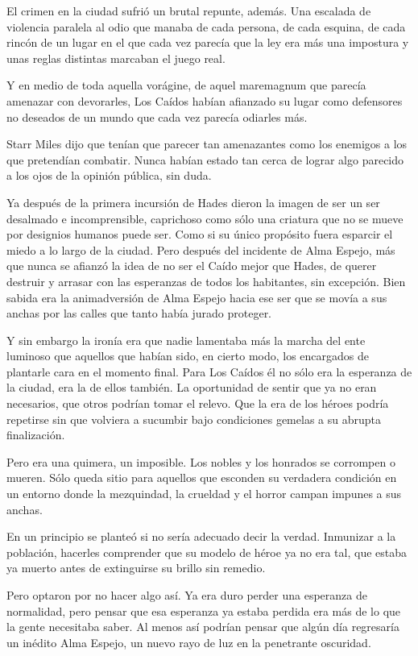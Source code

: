El crimen en la ciudad sufrió un brutal repunte, además. Una escalada de violencia paralela al odio que manaba de cada persona, de cada esquina, de cada rincón de un lugar en el que cada vez parecía que la ley era más una impostura y unas reglas distintas marcaban el juego real.

Y en medio de toda aquella vorágine, de aquel maremagnum que parecía amenazar con devorarles, Los Caídos habían afianzado su lugar como defensores no deseados de un mundo que cada vez parecía odiarles más.

Starr Miles dijo que tenían que parecer tan amenazantes como los enemigos a los que pretendían combatir. Nunca habían estado tan cerca de lograr algo parecido a los ojos de la opinión pública, sin duda.

Ya después de la primera incursión de Hades dieron la imagen de ser un ser desalmado e incomprensible, caprichoso como sólo una criatura que no se mueve por designios humanos puede ser. Como si su único propósito fuera esparcir el miedo a lo largo de la ciudad. Pero después del incidente de Alma Espejo, más que nunca se afianzó la idea de no ser el Caído mejor que Hades, de querer destruir y arrasar con las esperanzas de todos los habitantes, sin excepción. Bien sabida era la animadversión de Alma Espejo hacia ese ser que se movía a sus anchas por las calles que tanto había jurado proteger.

Y sin embargo la ironía era que nadie lamentaba más la marcha del ente luminoso que aquellos que habían sido, en cierto modo, los encargados de plantarle cara en el momento final. Para Los Caídos él no sólo era la esperanza de la ciudad, era la de ellos también. La oportunidad de sentir que ya no eran necesarios, que otros podrían tomar el relevo. Que la era de los héroes podría repetirse sin que volviera a sucumbir bajo condiciones gemelas a su abrupta finalización.

Pero era una quimera, un imposible. Los nobles y los honrados se corrompen o mueren. Sólo queda sitio para aquellos que esconden su verdadera condición en un entorno donde la mezquindad, la crueldad y el horror campan impunes a sus anchas.

En un principio se planteó si no sería adecuado decir la verdad. Inmunizar a la población, hacerles comprender que su modelo de héroe ya no era tal, que estaba ya muerto antes de extinguirse su brillo sin remedio.

Pero optaron por no hacer algo así. Ya era duro perder una esperanza de normalidad, pero pensar que esa esperanza ya estaba perdida era más de lo que la gente necesitaba saber. Al menos así podrían pensar que algún día regresaría un inédito Alma Espejo, un nuevo rayo de luz en la penetrante oscuridad.

